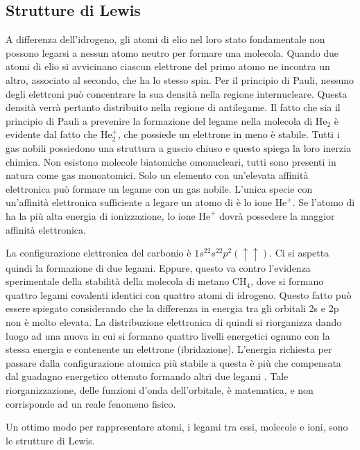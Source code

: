 \subsection{Strutture di Lewis}
A differenza dell'idrogeno, gli atomi di elio nel loro stato fondamentale non possono legarsi a nessun atomo neutro per formare una molecola.  Quando due atomi di elio si avvicinano ciascun elettrone del primo atomo ne incontra un altro, associato al secondo, che ha lo stesso spin. Per il principio di Pauli, nessuno degli elettroni può concentrare la sua densità nella regione internucleare. Questa densità verrà pertanto distribuito nella regione di antilegame. Il fatto che sia il principio di Pauli a prevenire la formazione del legame nella molecola di $\text{He}_2$ è evidente dal fatto che $\text{He}_2^+$, che possiede un elettrone in meno è stabile. Tutti i gas nobili possiedono una struttura a guscio chiuso e questo spiega la loro inerzia chimica. Non esistono molecole biatomiche omonucleari, tutti sono presenti in natura come gas monoatomici. Solo un elemento con un'elevata affinità elettronica può formare un legame con un gas nobile. L'unica specie con un'affinità elettronica sufficiente a legare un atomo di  è lo ione $\text{He}^+$. Se l'atomo di  ha la più alta energia di ionizzazione, lo ione $\text{He}^+$ dovrà possedere la maggior affinità elettronica. 
\begin{obs}
    La configurazione elettronica del carbonio è $1s^22s^22p^2(\uparrow\uparrow)$. Ci si aspetta quindi la formazione di due legami. Eppure, questo va contro l'evidenza sperimentale della stabilità della molecola di metano $\text{CH}_4$, dove si formano quattro legami covalenti identici con quattro atomi di idrogeno. Questo fatto può essere spiegato considerando che la differenza in energia tra gli orbitali 2s e 2p non è molto elevata. La distribuzione elettronica di  quindi si riorganizza dando luogo ad una nuova in cui si formano quattro livelli energetici ognuno con la stessa energia e contenente un elettrone (ibridazione). L'energia richiesta per passare dalla configurazione atomica più stabile a questa è più che compensata dal guadagno energetico ottenuto formando altri due legami . Tale riorganizzazione, delle funzioni d'onda dell'orbitale, è matematica, e non corrisponde ad un reale fenomeno fisico.
\end{obs}
Un ottimo modo per rappresentare atomi, i legami tra essi, molecole e ioni, sono le strutture di Lewis.
